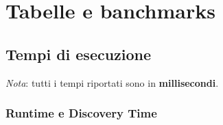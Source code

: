 \section{Tabelle e banchmarks}
\label{cap:tables-and-benchmarks}

\subsection{Tempi di esecuzione}
\label{sec:runtime-tables}

\emph{Nota}: tutti i tempi riportati sono in \textbf{millisecondi}.

\subsubsection{Runtime e Discovery Time}

